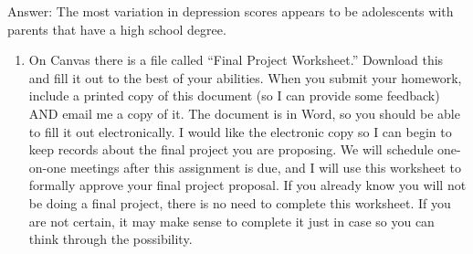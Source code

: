 \documentclass[]{article}
\providecommand{\tightlist}{%
  \setlength{\itemsep}{0pt}\setlength{\parskip}{0pt}}
\begin{document}
Answer: The most variation in depression scores appears to be
adolescents with parents that have a high school degree.

\begin{enumerate}
\def\labelenumi{\arabic{enumi})}
\setcounter{enumi}{7}
\tightlist
\item
  On Canvas there is a file called ``Final Project Worksheet.'' Download
  this and fill it out to the best of your abilities. When you submit
  your homework, include a printed copy of this document (so I can
  provide some feedback) AND email me a copy of it. The document is in
  Word, so you should be able to fill it out electronically. I would
  like the electronic copy so I can begin to keep records about the
  final project you are proposing. We will schedule one-on-one meetings
  after this assignment is due, and I will use this worksheet to
  formally approve your final project proposal. If you already know you
  will not be doing a final project, there is no need to complete this
  worksheet. If you are not certain, it may make sense to complete it
  just in case so you can think through the possibility.
\end{enumerate}
\end{document}
